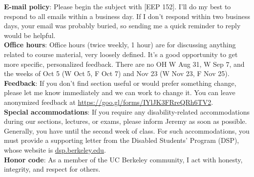 \documentclass[twoside]{article}
\begin{document}
	{\bf E-mail policy}: Please begin the subject with [EEP 152]. I'll do my best to respond to all emails within a business day. If I don't respond within two business days, your email was probably buried, so sending me a quick reminder to reply would be helpful. \\
	
	{\bf Office hours}: Office hours (twice weekly, 1 hour) are for discussing anything related to course material, very loosely defined. It's a good opportunity to get more specific, personalized feedback. There are no OH W Aug 31, W Sep 7, and the weeks of Oct 5 (W Oct 5, F Oct 7) and Nov 23 (W Nov 23, F Nov 25). \\
	
	{\bf Feedback}: If you don't find section useful or would prefer something change, please let me know immediately and we can work to change it. You can leave anonymized feedback at \href{https://goo.gl/forms/IYlJK3FRreQRh6TV2}{https://goo.gl/forms/IYlJK3FRreQRh6TV2}. \\
	
	{\bf Special accommodations}: If you require any disability-related accommodations during our sections, lectures, or exams, please inform Jeremy as soon as possible. Generally, you have until the second week of class. For such accommodations, you must provide a supporting letter from the Disabled Students' Program (DSP), whose website is \href{http://dsp.berkeley.edu}{dsp.berkeley.edu}. \\
	
	{\bf Honor code}: As a member of the UC Berkeley community, I act with honesty, integrity, and respect for others.
	
\end{document}
